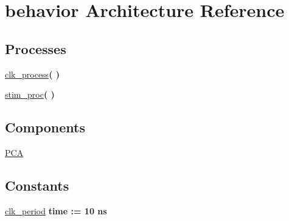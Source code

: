 \hypertarget{class_p_c_adder__tb_1_1behavior}{\section{behavior \-Architecture \-Reference}
\label{class_p_c_adder__tb_1_1behavior}
}
\*
\*
\subsection*{\-Processes}
 \begin{DoxyCompactItemize}
\item 
\hypertarget{class_p_c_adder__tb_1_1behavior_ac5bb218131b813f7908ec89476b31fca}{\hyperlink{class_p_c_adder__tb_1_1behavior_ac5bb218131b813f7908ec89476b31fca}{clk\-\_\-process}{\bfseries  (  )}}\label{class_p_c_adder__tb_1_1behavior_ac5bb218131b813f7908ec89476b31fca}

\item 
\hypertarget{class_p_c_adder__tb_1_1behavior_ad2efa6785cff833c341e27596b21aeb5}{\hyperlink{class_p_c_adder__tb_1_1behavior_ad2efa6785cff833c341e27596b21aeb5}{stim\-\_\-proc}{\bfseries  (  )}}\label{class_p_c_adder__tb_1_1behavior_ad2efa6785cff833c341e27596b21aeb5}

\end{DoxyCompactItemize}
\subsection*{\-Components}
 \begin{DoxyCompactItemize}
\item 
\hypertarget{class_p_c_adder__tb_1_1behavior_a5dc0e950c743b6867902097030b977b0}{\hyperlink{class_p_c_adder__tb_1_1behavior_a5dc0e950c743b6867902097030b977b0}{\-P\-C\-A}  {\bfseries }  }\label{class_p_c_adder__tb_1_1behavior_a5dc0e950c743b6867902097030b977b0}

\end{DoxyCompactItemize}
\subsection*{\-Constants}
 \begin{DoxyCompactItemize}
\item 
\hypertarget{class_p_c_adder__tb_1_1behavior_ab3c46918aa1e58060e340ba6e16733a9}{\hyperlink{class_p_c_adder__tb_1_1behavior_ab3c46918aa1e58060e340ba6e16733a9}{clk\-\_\-period} {\bfseries time  \-:=  10  ns } }\label{class_p_c_adder__tb_1_1behavior_ab3c46918aa1e58060e340ba6e16733a9}

\end{DoxyCompactItemize}
